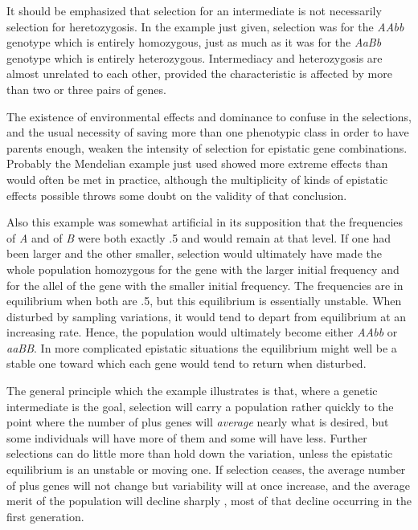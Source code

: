 It should be emphasized that selection for an intermediate is not
necessarily selection for heretozygosis. In the example just given, selection
was for the \textit{AAbb} genotype which is entirely homozygous, just as
much as it was for the \textit{AaBb} genotype which is entirely heterozygous.
Intermediacy and heterozygosis are almost unrelated to each other, provided
the characteristic is affected by more than two or three pairs of
genes.\label{page_137}

The existence of environmental effects and dominance to confuse in
the selections, and the usual necessity of saving more than one phenotypic
class in order to have parents enough, weaken the intensity of
selection for epistatic gene combinations. Probably the Mendelian
example just used showed more extreme effects than would often be
met in practice, although the multiplicity of kinds of epistatic effects
possible throws some doubt on the validity of that conclusion.

Also this example was somewhat artificial in its supposition that the
frequencies of \textit{A} and of \textit{B} were both exactly .5 and would remain at
that level. If one had been larger and the other smaller, selection would
ultimately have made the whole population homozygous for the gene
with the larger initial frequency and for the allel of the gene with the
smaller initial frequency. The frequencies are in equilibrium when
both are .5, but this equilibrium is essentially unstable. When disturbed
by sampling variations, it would tend to depart from equilibrium at an
increasing rate. Hence, the population would ultimately become either
\textit{AAbb} or \textit{aaBB}. In more complicated epistatic situations the equilibrium
might well be a stable one toward which each gene would tend to
return when disturbed.\label{page137}

The general principle which the example illustrates is that, where a
genetic intermediate is the goal, selection will carry a population rather
quickly to the point where the number of plus genes will \textit{average} nearly
what is desired, but some individuals will have more of them and some
will have less. Further selections can do little more than hold down the
variation, unless the epistatic equilibrium is an unstable or moving
one. If selection ceases, the average number of plus genes will not
change but variability will at once increase, and the average merit of
the population will decline sharply , most of that decline occurring in
the first generation.

